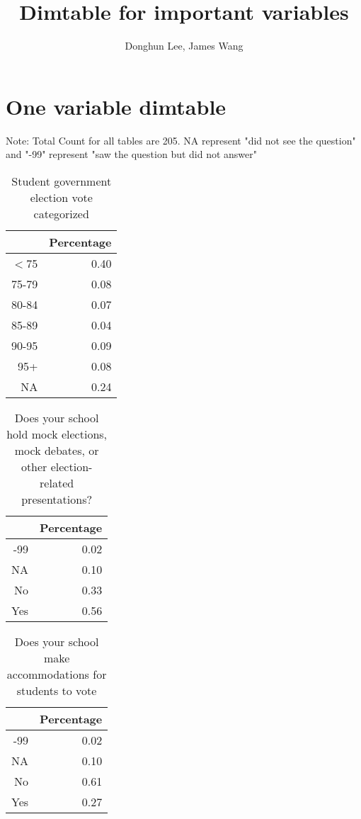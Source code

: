 \documentclass[12pt]{article}
\begin{document}
\title{Dimtable for important variables}
\author{Donghun Lee, James Wang}
\maketitle

\section{One variable dimtable}
Note: Total Count for all tables are 205. NA represent "did not see the question" and "-99" represent "saw the question but did not answer" 
\begin{table}[ht]
\caption {Student government election vote categorized}
\centering
\begin{tabular}{rr}
  \hline
 & Percentage \\ 
  \hline
$<$75 & 0.40 \\ 
  75-79 & 0.08 \\ 
  80-84 & 0.07 \\ 
  85-89 & 0.04 \\ 
  90-95 & 0.09 \\ 
  95+ & 0.08 \\ 
  NA & 0.24 \\ 
   \hline
\end{tabular}
\end{table}
\begin{table}[ht]
\caption {Does your school hold mock elections, mock debates, or other election-related presentations?}
\centering
\begin{tabular}{rr}
  \hline
 & Percentage \\ 
  \hline
-99 & 0.02 \\ 
  NA & 0.10 \\ 
  No & 0.33 \\ 
  Yes & 0.56 \\ 
   \hline
\end{tabular}
\end{table}
\begin{table}[ht]
\caption {Does your school make accommodations for students to vote}
\centering
\begin{tabular}{rr}
  \hline
 & Percentage \\ 
  \hline
-99 & 0.02 \\ 
  NA & 0.10 \\ 
  No & 0.61 \\ 
  Yes & 0.27 \\ 
   \hline
\end{tabular}
\end{table}
\end{document}
